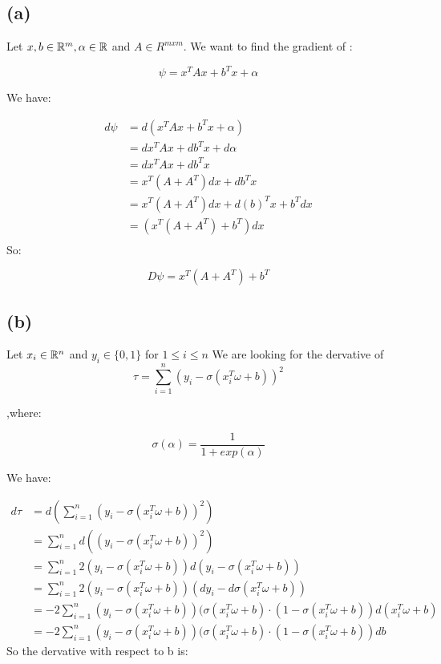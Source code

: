 
\subsection*{(a)}

    Let $x,b \in \mathbb{R}^m, \alpha \in \mathbb{R}$ and $A \in R^{mxm}$. We want to find the gradient of :
    
    \[
    \psi = x^TAx+ b^Tx+\alpha    
    \]

    We have:

    \begin{align*}
        d\psi   &= d(x^TAx+b^Tx+\alpha)\\
                &= dx^TAx+db^Tx+d\alpha\\
                &= dx^TAx+db^Tx\\
                &= x^T(A+A^T)dx +db^Tx \\
                &= x^T(A+A^T)dx +d(b)^Tx+b^Tdx \\
                &= (x^T(A+A^T)+b^T)dx\\
    \end{align*}
So:

\[
D\psi= x^T(A+A^T)+b^T   
\]

\subsection*{(b)}
Let $x_i \in \mathbb{R}^n$ and $y_i \in \{0,1\}$ for $1 \leq i \leq n$ We are looking for the dervative of 
\[
\tau = \sum_{i=1}^n(y_i-\sigma(x_i^T\omega +b))^2 
\]

,where:

\[
\sigma(\alpha) = \frac{1}{1+exp(\alpha)} 
\]

We have:

\begin{align*}
    d\tau   &=d(\sum_{i=1}^n(y_i-\sigma(x_i^T\omega +b))^2 ) \\
            &= \sum_{i=1}^nd((y_i-\sigma(x_i^T\omega +b))^2) \\
            &=\sum_{i=1}^n2(y_i-\sigma(x_i^T\omega +b))d(y_i-\sigma(x_i^T\omega +b))  \\
            &=\sum_{i=1}^n2(y_i-\sigma(x_i^T\omega +b))(dy_i-d\sigma(x_i^T\omega +b))  \\
            &=-2\sum_{i=1}^n(y_i-\sigma(x_i^T\omega +b))(\sigma(x_i^T\omega +b)\cdot(1-\sigma(x_i^T\omega +b))d(x_i^T\omega +b)  \\
            &=-2\sum_{i=1}^n(y_i-\sigma(x_i^T\omega +b))(\sigma(x_i^T\omega +b)\cdot(1-\sigma(x_i^T\omega +b))db
\end{align*}
 So the dervative with respect to b is:

